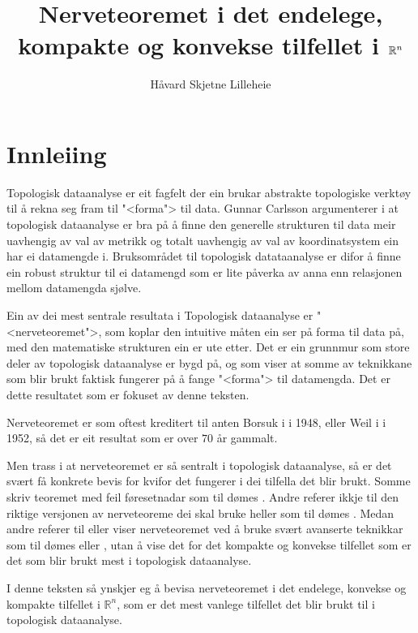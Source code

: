 \documentclass[a4paper, 12pt, norsk]{article}
\title{Nerveteoremet i det endelege, kompakte og konvekse tilfellet i \( \Rb^n \)}
\author{Håvard Skjetne Lilleheie}
\theoremstyle{plain}
\theoremstyle{definition}
\newcommand{\Rb}{\mathbb{R}}
\begin{document}
\maketitle

\tableofcontents

\newpage

\section{Innleiing} \label{sec:innleiing}

Topologisk dataanalyse er eit fagfelt der ein brukar abstrakte topologiske verktøy til å rekna seg fram til "<forma"> til data. Gunnar Carlsson argumenterer i \cite{MR2476414} at topologisk dataanalyse er bra på å finne den generelle strukturen til data meir uavhengig av val av metrikk og totalt uavhengig av val av koordinatsystem ein har ei datamengde i. Bruksområdet til topologisk datataanalyse er difor å finne ein robust struktur til ei datamengd som er lite påverka av anna enn relasjonen mellom datamengda sjølve.

Ein av dei mest sentrale resultata i Topologisk dataanalyse er "<nerveteoremet">, som koplar den intuitive måten ein ser på forma til data på, med den matematiske strukturen ein er ute etter. Det er ein grunnmur som store deler av topologisk dataanalyse er bygd på, og som viser at somme av teknikkane som blir brukt faktisk fungerer på å fange "<forma"> til datamengda. Det er dette resultatet som er fokuset av denne teksten.

Nerveteoremet er som oftest kreditert til anten Borsuk i \cite{MR28019} i 1948, eller Weil i \cite{MR50280} i 1952, så det er eit resultat som er over \( 70 \) år gammalt.

Men trass i at nerveteoremet er så sentralt i topologisk dataanalyse, så er det svært få konkrete bevis for kvifor det fungerer i dei tilfella det blir brukt. Somme skriv teoremet med feil føresetnadar som til dømes \cite[Theorem 2.1]{MR4381505}. Andre referer ikkje til den riktige versjonen av nerveteoreme dei skal bruke heller som til dømes \cite[Lemma 4.11]{MR3408277}. Medan andre referer til eller viser nerveteoremet ved å bruke svært avanserte teknikkar som til dømes \cite[Corollary 4G.3]{MR1867354} eller \cite[Theorem 15.21]{MR2361455}, utan å vise det for det kompakte og konvekse tilfellet som er det som blir brukt mest i topologisk dataanalyse.

I denne teksten så ynskjer eg å bevisa nerveteoremet i det endelege, konvekse og kompakte tilfellet i \( \Rb^n \), som er det mest vanlege tilfellet det blir brukt til i topologisk dataanalyse.
\end{document}
